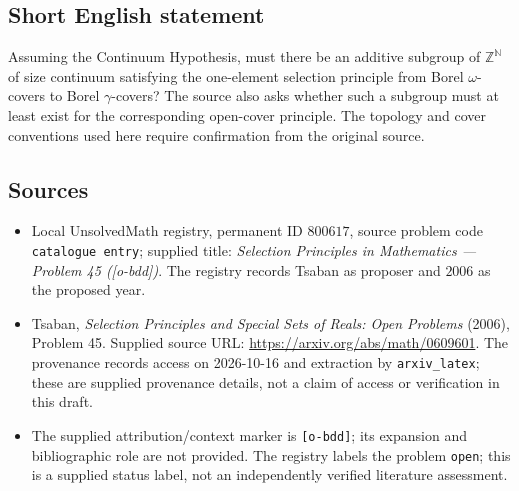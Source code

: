 \documentclass[11pt]{article}
\newcommand{\N}{\mathbb{N}}
\newcommand{\Z}{\mathbb{Z}}
\begin{document}
\subsection{Short English statement}
Assuming the Continuum Hypothesis, must there be an additive subgroup of \(\Z^{\N}\) of size continuum satisfying the one-element selection principle from Borel \(\omega\)-covers to Borel \(\gamma\)-covers? The source also asks whether such a subgroup must at least exist for the corresponding open-cover principle. The topology and cover conventions used here require confirmation from the original source.
\subsection{Sources}
\begin{itemize}
\item Local UnsolvedMath registry, permanent ID \(800617\), source problem code \texttt{catalogue entry}; supplied title: \emph{Selection Principles in Mathematics --- Problem 45 ([o-bdd])}. The registry records Tsaban as proposer and \(2006\) as the proposed year.
\item Tsaban, \emph{Selection Principles and Special Sets of Reals: Open Problems} (2006), Problem 45. Supplied source URL: \url{https://arxiv.org/abs/math/0609601}. The provenance records access on 2026-10-16 and extraction by \texttt{arxiv\_latex}; these are supplied provenance details, not a claim of access or verification in this draft.
\item The supplied attribution/context marker is \texttt{[o-bdd]}; its expansion and bibliographic role are not provided. The registry labels the problem \texttt{open}; this is a supplied status label, not an independently verified literature assessment.
\end{itemize}
\end{document}
